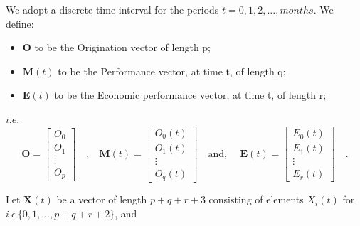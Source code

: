        \noindent We adopt a discrete time interval for the periods $t = 0,1,2, ..., months$. We define:
        \begin{itemize}
          \item $\textbf{O}$ to be the Origination vector of length p; 
          \item $\textbf{M} (t)$ to be the Performance vector, at time t, of length q;
          \item $\textbf{E} (t)$ to be the Economic performance vector, at time t, of length r;
        \end{itemize}
        $i.e.$
        \begin{equation}
            \textbf{O} = \begin{bmatrix}
                   O _0 \\[0.3em]
                   O_1 \\[0.3em]
                   \vdots \\[0.3em]
                   O _p
                 \end{bmatrix}
            \quad \textrm{,} \quad
            \textbf{M} (t) = \begin{bmatrix}
                   O _0 (t) \\[0.3em]
                   O_1 (t) \\[0.3em]
                   \vdots \\[0.3em]
                   O _q (t)
                 \end{bmatrix}
            \quad \textrm{and, } \quad
            \textbf{E} (t) = \begin{bmatrix}
                   E _0 (t) \\[0.3em]
                   E_1 (t) \\[0.3em]
                   \vdots \\[0.3em]
                   E _r (t)
                 \end{bmatrix}
            \quad \textrm{.}
        \end{equation}
        
        \vspace{20pt}
        
        \noindent Let $\textbf{X}(t)$ be a vector of length $p + q + r + 3$ consisting of elements $X _i (t)$ for $i\: \epsilon\: \{0,1,..., p + q + r + 2\} $, and
        
        \vspace{20pt}
        
